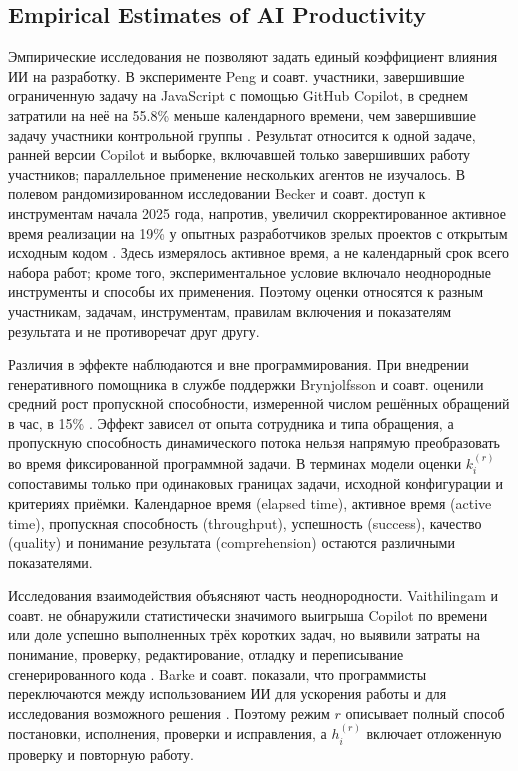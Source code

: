 \subsection{Empirical Estimates of AI Productivity}

Эмпирические исследования не позволяют задать единый коэффициент влияния ИИ на разработку. В эксперименте Peng и соавт. участники, завершившие ограниченную задачу на JavaScript с помощью GitHub Copilot, в среднем затратили на неё на 55.8\% меньше календарного времени, чем завершившие задачу участники контрольной группы \cite{peng2023impact}. Результат относится к одной задаче, ранней версии Copilot и выборке, включавшей только завершивших работу участников; параллельное применение нескольких агентов не изучалось. В полевом рандомизированном исследовании Becker и соавт. доступ к инструментам начала 2025 года, напротив, увеличил скорректированное активное время реализации на 19\% у опытных разработчиков зрелых проектов с открытым исходным кодом \cite{becker2025measuring}. Здесь измерялось активное время, а не календарный срок всего набора работ; кроме того, экспериментальное условие включало неоднородные инструменты и способы их применения. Поэтому оценки относятся к разным участникам, задачам, инструментам, правилам включения и показателям результата и не противоречат друг другу.

Различия в эффекте наблюдаются и вне программирования. При внедрении генеративного помощника в службе поддержки Brynjolfsson и соавт. оценили средний рост пропускной способности, измеренной числом решённых обращений в час, в 15\% \cite{brynjolfsson2025generative}. Эффект зависел от опыта сотрудника и типа обращения, а пропускную способность динамического потока нельзя напрямую преобразовать во время фиксированной программной задачи. В терминах модели оценки $k_i^{(r)}$ сопоставимы только при одинаковых границах задачи, исходной конфигурации и критериях приёмки. Календарное время (elapsed time), активное время (active time), пропускная способность (throughput), успешность (success), качество (quality) и понимание результата (comprehension) остаются различными показателями.

Исследования взаимодействия объясняют часть неоднородности. Vaithilingam и соавт. не обнаружили статистически значимого выигрыша Copilot по времени или доле успешно выполненных трёх коротких задач, но выявили затраты на понимание, проверку, редактирование, отладку и переписывание сгенерированного кода \cite{vaithilingam2022expectation}. Barke и соавт. показали, что программисты переключаются между использованием ИИ для ускорения работы и для исследования возможного решения \cite{barke2023grounded}. Поэтому режим $r$ описывает полный способ постановки, исполнения, проверки и исправления, а $h_i^{(r)}$ включает отложенную проверку и повторную работу.

